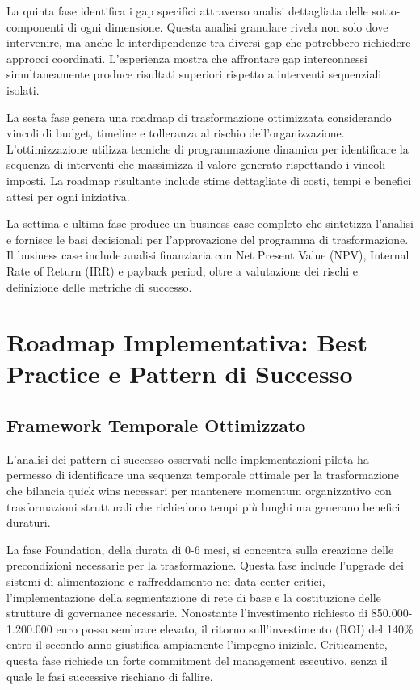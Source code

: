 La quinta fase identifica i gap specifici attraverso analisi dettagliata delle sotto-componenti di ogni dimensione. Questa analisi granulare rivela non solo dove intervenire, ma anche le interdipendenze tra diversi gap che potrebbero richiedere approcci coordinati. L'esperienza mostra che affrontare gap interconnessi simultaneamente produce risultati superiori rispetto a interventi sequenziali isolati.

La sesta fase genera una roadmap di trasformazione ottimizzata considerando vincoli di budget, timeline e tolleranza al rischio dell'organizzazione. L'ottimizzazione utilizza tecniche di programmazione dinamica per identificare la sequenza di interventi che massimizza il valore generato rispettando i vincoli imposti. La roadmap risultante include stime dettagliate di costi, tempi e benefici attesi per ogni iniziativa.

La settima e ultima fase produce un business case completo che sintetizza l'analisi e fornisce le basi decisionali per l'approvazione del programma di trasformazione. Il business case include analisi finanziaria con Net Present Value (NPV), Internal Rate of Return (IRR) e payback period, oltre a valutazione dei rischi e definizione delle metriche di successo.

\section{Roadmap Implementativa: Best Practice e Pattern di Successo}

\subsection{Framework Temporale Ottimizzato}

L'analisi dei pattern di successo osservati nelle implementazioni pilota ha permesso di identificare una sequenza temporale ottimale per la trasformazione che bilancia quick wins necessari per mantenere momentum organizzativo con trasformazioni strutturali che richiedono tempi più lunghi ma generano benefici duraturi.

La fase Foundation, della durata di 0-6 mesi, si concentra sulla creazione delle precondizioni necessarie per la trasformazione. Questa fase include l'upgrade dei sistemi di alimentazione e raffreddamento nei data center critici, l'implementazione della segmentazione di rete di base e la costituzione delle strutture di governance necessarie. Nonostante l'investimento richiesto di 850.000-1.200.000 euro possa sembrare elevato, il ritorno sull'investimento (ROI) del 140\% entro il secondo anno giustifica ampiamente l'impegno iniziale. Criticamente, questa fase richiede un forte commitment del management esecutivo, senza il quale le fasi successive rischiano di fallire.

